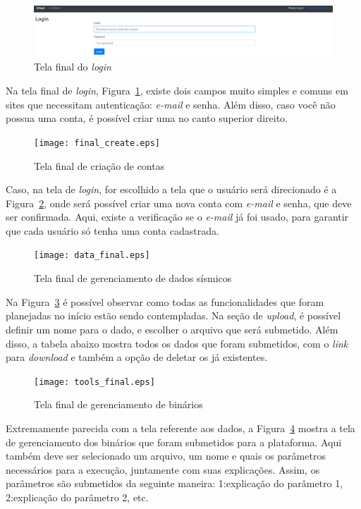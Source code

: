 \documentclass[11pt,twoside]{article}
\begin{document}
\begin{figure}[!h]
  \centering
  \includegraphics[scale=0.3]{final_login.eps}
  \caption{Tela final do \emph{login}}
  \label{fig:finalLogin}
\end{figure}

Na tela final de \emph{login}, Figura~\ref{fig:finalLogin}, existe dois campos muito simples e comuns em sites que necessitam autenticação: \emph{e-mail} e senha. Além disso, caso você não possua uma conta, é possível criar uma no canto superior direito.

\begin{figure}[!h]
  \centering
  \texttt{[image: final\_create.eps]}
  \caption{Tela final de criação de contas}
  \label{fig:finalCreate}
\end{figure}

Caso, na tela de \emph{login}, for escolhido a tela que o usuário será direcionado é a Figura~\ref{fig:finalCreate}, onde será possível criar uma nova conta com \emph{e-mail} e senha, que deve ser confirmada. Aqui, existe a verificação
se o \emph{e-mail} já foi usado, para garantir que cada usuário só tenha uma conta cadastrada.

\begin{figure}[!h]
  \centering
  \texttt{[image: data\_final.eps]}
  \caption{Tela final de gerenciamento de dados sísmicos}
  \label{fig:finalData}
\end{figure}

Na Figura~\ref{fig:finalData} é possível observar como todas as funcionalidades que foram planejadas no início estão sendo contempladas. Na seção de \emph{upload}, é possível definir um nome para o dado, e escolher o 
arquivo que será submetido. Além disso, a tabela abaixo mostra todos os dados que foram submetidos, com o \emph{link} para \emph{download} e também a opção de deletar os já existentes.

\begin{figure}[!h]
  \centering
  \texttt{[image: tools\_final.eps]}
  \caption{Tela final de gerenciamento de binários}
  \label{fig:finalTools}
\end{figure}

Extremamente parecida com a tela referente aos dados, a Figura~\ref{fig:finalTools} mostra a tela de gerenciamento dos binários que foram submetidos para a plataforma. Aqui também deve
ser selecionado um arquivo, um nome e quais os parâmetros necessários para a execução, juntamente com suas explicações. Assim, os parâmetros são submetidos da seguinte maneira: 1:explicação do parâmetro 1,
2:explicação do parâmetro 2, etc.
\end{document}

